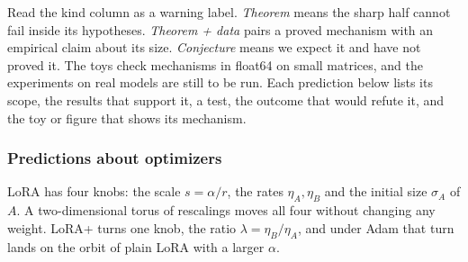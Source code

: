 Read the kind column as a warning label. \emph{Theorem} means the sharp half cannot fail inside its hypotheses.
\emph{Theorem + data} pairs a proved mechanism with an empirical claim about its size. \emph{Conjecture} means we
expect it and have not proved it. The toys check mechanisms in float64 on small matrices, and the experiments on real
models are still to be run. Each prediction below lists its scope, the results that support it, a test, the outcome
that would refute it, and the toy or figure that shows its mechanism.

\subsubsection{Predictions about optimizers}\label{sec:predictions-optimizers}

LoRA has four knobs: the scale $s=\alpha/r$, the rates $\eta_A,\eta_B$ and the initial size $\sigma_A$ of $A$. A
two-dimensional torus of rescalings moves all four without changing any weight. LoRA+ turns one knob, the ratio
$\lambda=\eta_B/\eta_A$, and under Adam that turn lands on the orbit of plain LoRA with a larger $\alpha$.

